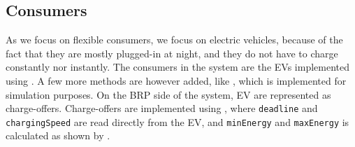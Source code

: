 \subsection{Consumers}
As we focus on flexible consumers, we focus on electric vehicles, because of the fact that they are mostly plugged-in at night, and they do not have to charge constantly nor instantly. The consumers in the system are the EVs implemented using . A few more methods are however added, like , which is implemented for simulation purposes. On the BRP side of the system, EV are represented as charge-offers. Charge-offers are implemented using , where \texttt{deadline} and \texttt{chargingSpeed} are read directly from the EV, and \texttt{minEnergy} and \texttt{maxEnergy} is calculated as shown by .
